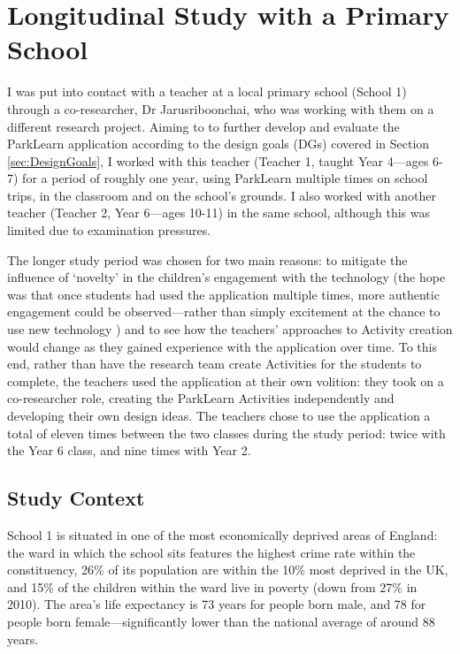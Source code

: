 \section{Longitudinal Study with a Primary School}
\label{sec:LongitudinalSchool}

I was put into contact with a teacher at a local primary school (School 1) through a co-researcher, Dr Jarusriboonchai, who was working with them on a different research project. Aiming to to further develop and evaluate the ParkLearn application according to the design goals (DGs) covered in Section \ref{sec:DesignGoals}, I worked with this teacher (Teacher 1, taught Year 4---ages 6-7) for a period of roughly one year, using ParkLearn multiple times on school trips, in the classroom and on the school's grounds. I also worked with another teacher (Teacher 2, Year 6---ages 10-11) in the same school, although this was limited due to examination pressures. 

The longer study period was chosen for two main reasons: to mitigate the influence of `novelty' in the children’s engagement with the technology (the hope was that once students had used the application multiple times, more authentic engagement could be observed---rather than simply excitement at the chance to use new technology \citep{Sharples2013}) and to see how the teachers' approaches to Activity creation would change as they gained experience with the application over time. To this end, rather than have the research team create Activities for the students to complete, the teachers used the application at their own volition: they took on a co-researcher role, creating the ParkLearn Activities independently and developing their own design ideas. The teachers chose to use the application a total of eleven times between the two classes during the study period: twice with the Year 6 class, and nine times with Year 2.

\subsection{Study Context}
School 1 is situated in one of the most economically deprived areas of England: the ward in which the school sits features the highest crime rate within the constituency, 26\% of its population are within the 10\% most deprived in the UK, and 15\% of the children within the ward live in poverty (down from 27\% in 2010). The area's life expectancy is 73 years for people born male, and 78 for people born female---significantly lower than the national average of around 88 years.

